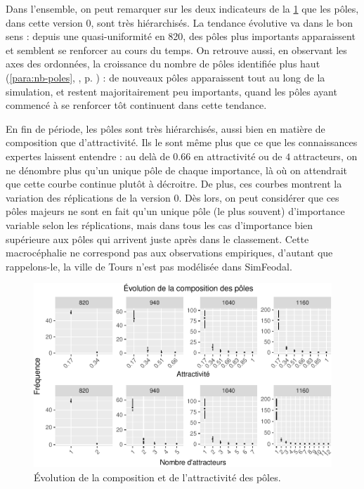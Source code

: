 \begin{mdframed}[backgroundcolor=gray!10,footnoteinside=false]
Dans l'ensemble, on peut remarquer sur les deux indicateurs de la \cref{fig:compo-poles-v0} que les pôles, dans cette version 0, sont très hiérarchisés.
La tendance \og évolutive va dans le bon sens :
depuis une quasi-uniformité en 820, des pôles plus importants apparaissent et semblent se renforcer au cours du temps.
On retrouve aussi, en observant les axes des ordonnées, la croissance du nombre de pôles identifiée plus haut (\ref{para:nb-poles}, , p. \pageref{para:nb-poles}) :
de nouveaux pôles apparaissent tout au long de la simulation, et restent majoritairement peu importants, quand les pôles ayant commencé à se renforcer tôt continuent dans cette tendance.

En fin de période, les pôles sont très hiérarchisés, aussi bien en matière de composition que d'attractivité.
Ils le sont même plus que ce que les connaissances expertes laissent entendre :
au delà de $0.66$ en attractivité ou de $4$ attracteurs, on ne dénombre plus qu'un unique pôle de chaque importance, là où on attendrait que cette courbe continue plutôt à décroitre.
De plus, ces courbes montrent la variation des réplications de la version 0.
Dès lors, on peut considérer que ces pôles majeurs ne sont en fait qu'un unique pôle (le plus souvent) d'importance variable selon les réplications, mais dans tous les cas d'importance bien supérieure aux pôles qui arrivent juste après dans le classement.
Cette macrocéphalie ne correspond pas aux observations empiriques, d'autant que rappelons-le, la ville de Tours n'est pas modélisée dans SimFeodal.


\end{mdframed}

\begin{figure}[H]
\captionsetup{width=\linewidth}
\includegraphics[width=\linewidth]{img/resultats/v0_compo_poles.pdf}
\caption{Évolution de la composition et de l'attractivité des pôles\protect\footnotemark{}.}
\label{fig:compo-poles-v0}
\end{figure}

